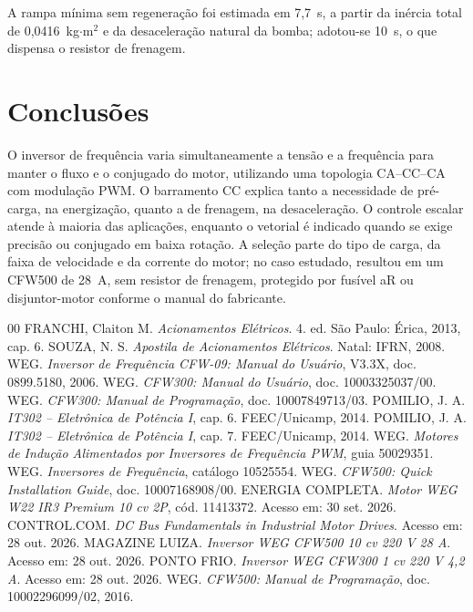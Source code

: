 \documentclass[conference]{IEEEtran}
\begin{document}
A rampa mínima sem regeneração foi estimada em 7,7~s, a partir da inércia total de 0,0416~kg$\cdot$m$^2$ e da desaceleração natural da bomba; adotou-se 10~s, o que dispensa o resistor de frenagem.

\section{Conclusões}

O inversor de frequência varia simultaneamente a tensão e a frequência para manter o fluxo e o conjugado do motor, utilizando uma topologia CA--CC--CA com modulação PWM. O barramento CC explica tanto a necessidade de pré-carga, na energização, quanto a de frenagem, na desaceleração. O controle escalar atende à maioria das aplicações, enquanto o vetorial é indicado quando se exige precisão ou conjugado em baixa rotação. A seleção parte do tipo de carga, da faixa de velocidade e da corrente do motor; no caso estudado, resultou em um CFW500 de 28~A, sem resistor de frenagem, protegido por fusível aR ou disjuntor-motor conforme o manual do fabricante.

\begin{thebibliography}{00}
 FRANCHI, Claiton M. \textit{Acionamentos Elétricos}. 4. ed. São Paulo: Érica, 2013, cap. 6.
 SOUZA, N. S. \textit{Apostila de Acionamentos Elétricos}. Natal: IFRN, 2008.
 WEG. \textit{Inversor de Frequência CFW-09: Manual do Usuário}, V3.3X, doc. 0899.5180, 2006.
 WEG. \textit{CFW300: Manual do Usuário}, doc. 10003325037/00.
 WEG. \textit{CFW300: Manual de Programação}, doc. 10007849713/03.
 POMILIO, J. A. \textit{IT302 -- Eletrônica de Potência I}, cap. 6. FEEC/Unicamp, 2014.
 POMILIO, J. A. \textit{IT302 -- Eletrônica de Potência I}, cap. 7. FEEC/Unicamp, 2014.
 WEG. \textit{Motores de Indução Alimentados por Inversores de Frequência PWM}, guia 50029351.
 WEG. \textit{Inversores de Frequência}, catálogo 10525554.
 WEG. \textit{CFW500: Quick Installation Guide}, doc. 10007168908/00.
 ENERGIA COMPLETA. \textit{Motor WEG W22 IR3 Premium 10 cv 2P}, cód. 11413372. Acesso em: 30 set. 2026.
 CONTROL.COM. \textit{DC Bus Fundamentals in Industrial Motor Drives}. Acesso em: 28 out. 2026.
 MAGAZINE LUIZA. \textit{Inversor WEG CFW500 10 cv 220 V 28 A}. Acesso em: 28 out. 2026.
 PONTO FRIO. \textit{Inversor WEG CFW300 1 cv 220 V 4,2 A}. Acesso em: 28 out. 2026.
 WEG. \textit{CFW500: Manual de Programação}, doc. 10002296099/02, 2016.
\end{thebibliography}
\end{document}
